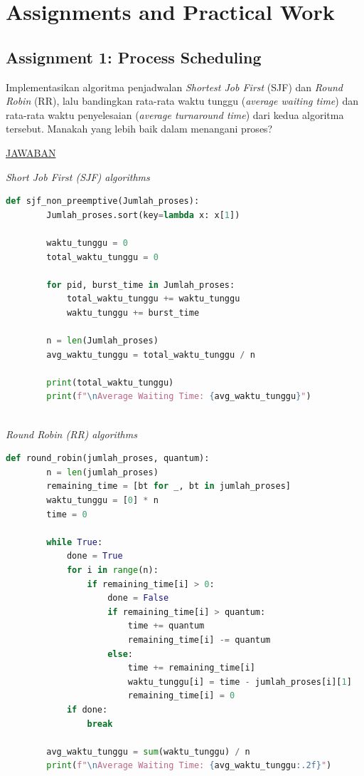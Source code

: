 \documentclass[12pt]{article}
\begin{document}
\section{Assignments and Practical Work}
\subsection{Assignment 1: Process Scheduling}
\hspace*{1cm} Implementasikan algoritma penjadwalan \textit{Shortest Job First} (SJF) dan \textit{Round Robin} (RR), lalu bandingkan rata-rata waktu tunggu (\textit{average waiting time}) dan rata-rata waktu penyelesaian (\textit{average turnaround time}) dari kedua algoritma tersebut. Manakah yang lebih baik dalam menangani proses? 
\newline
\newline

\begin{center}
    \underline{JAWABAN}
\end{center}

\textit{Short Job First (SJF) algorithms}
\begin{lstlisting}[language=Python]
    def sjf_non_preemptive(Jumlah_proses):
        Jumlah_proses.sort(key=lambda x: x[1])
    
        waktu_tunggu = 0
        total_waktu_tunggu = 0
    
        for pid, burst_time in Jumlah_proses:
            total_waktu_tunggu += waktu_tunggu
            waktu_tunggu += burst_time
    
        n = len(Jumlah_proses)
        avg_waktu_tunggu = total_waktu_tunggu / n
    
        print(total_waktu_tunggu)
        print(f"\nAverage Waiting Time: {avg_waktu_tunggu}")    
    
\end{lstlisting}

\textit{Round Robin (RR) algorithms}
\begin{lstlisting}[language=Python]
    def round_robin(jumlah_proses, quantum):
        n = len(jumlah_proses)
        remaining_time = [bt for _, bt in jumlah_proses]
        waktu_tunggu = [0] * n
        time = 0
    
        while True:
            done = True
            for i in range(n):
                if remaining_time[i] > 0:
                    done = False
                    if remaining_time[i] > quantum:
                        time += quantum
                        remaining_time[i] -= quantum
                    else:
                        time += remaining_time[i]
                        waktu_tunggu[i] = time - jumlah_proses[i][1]
                        remaining_time[i] = 0
            if done:
                break
    
        avg_waktu_tunggu = sum(waktu_tunggu) / n
        print(f"\nAverage Waiting Time: {avg_waktu_tunggu:.2f}")
    
\end{lstlisting}
\end{document}
